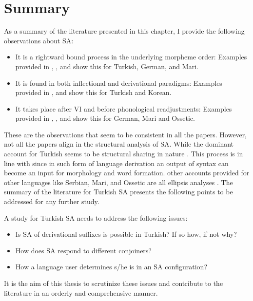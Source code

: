\section{Summary}

As a summary of the literature presented in this chapter, I provide the following observations about SA:

\begin{itemize}
    \item It is a rightward bound process in the underlying morpheme order: Examples provided in \cite{kabak2007turkish}, \cite{pounder2006broken}, and \cite{guseva2017postsyntactic} show this for Turkish, German, and Mari.
    
    \item It is found in both inflectional and derivational paradigms: Examples provided in \cite{kabak2007turkish}, and \cite{yoon2017lexical} show this for Turkish and Korean.

    \item It takes place after VI and before phonological readjustments: Examples provided in  \cite{pounder2006broken}, \cite{guseva2017postsyntactic}, and \cite{erschler2018suspended} show this for German, Mari and Ossetic.
\end{itemize}

These are the observations that seem to be consistent in all the papers. However, not all the papers align in the structural analysis of SA. While the dominant account for Turkish seems to be structural sharing in nature \citep{orgun1995flat,kornfilt1996some,broadwell2008turkish,kornfilt2012revisiting}. This process is in line with \cite{ackema2004beyond,kunduraci2016morphology, bruening2018word} since in such form of language derivation an output of syntax can become an input for morphology and word formation. other accounts provided for other languages like Serbian, Mari, and Ossetic are all ellipsis analyses \citep{despic2017suspended,guseva2017postsyntactic,erschler2018suspended}. The summary of the literature for Turkish SA presents the following points to be addressed for any further study.

A study for Turkish SA needs to address the following issues:

\begin{itemize}
    \item Is SA of derivational suffixes is possible in Turkish? If so how, if not why?
    \item How  does SA respond to different conjoiners? 
    \item How a language user determines s/he is in an SA configuration?
\end{itemize}

It is the aim of this thesis to scrutinize these issues and contribute to the literature in an orderly and comprehensive manner.